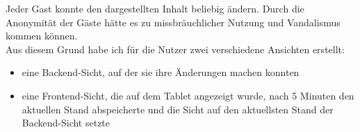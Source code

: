 Jeder Gast konnte den dargestellten Inhalt beliebig ändern.
Durch die Anonymität der Gäste hätte es zu missbräuchlicher Nutzung und Vandalismus kommen können.
\\
Aus diesem Grund habe ich für die Nutzer zwei verschiedene Ansichten erstellt:
\\
\begin{itemize}
  \item eine Backend-Sicht, auf der sie ihre Änderungen machen konnten
  \item eine Frontend-Sicht, die auf dem Tablet angezeigt wurde, nach 5 Minuten den aktuellen Stand abspeicherte und die Sicht auf den aktuellsten Stand der Backend-Sicht setzte
\end{itemize}



